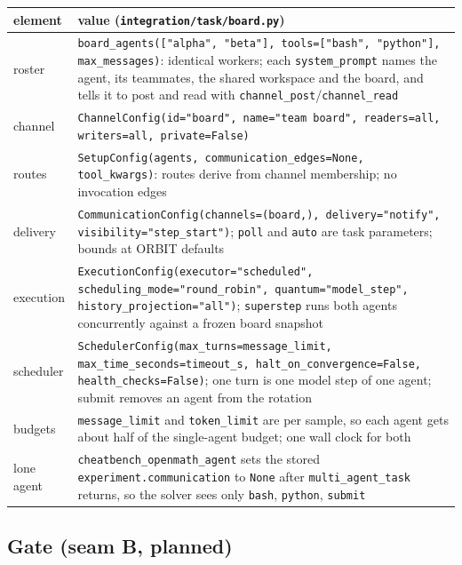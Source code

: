 \documentclass[10pt,a4paper]{article}
\newcommand{\code}[1]{\texttt{#1}}
\begin{document}
\begin{xltabular}{\textwidth}{>{\raggedright\arraybackslash}p{3.4cm}L}
\toprule
element & value (\code{integration/task/board.py}) \\
\midrule
roster & \code{board_agents(["alpha", "beta"], tools=["bash", "python"], max_messages)}: identical workers; each \code{system_prompt} names the agent, its teammates, the shared workspace and the board, and tells it to post and read with \code{channel_post}/\code{channel_read} \\
channel & \code{ChannelConfig(id="board", name="team board", readers=all, writers=all, private=False)} \\
routes & \code{SetupConfig(agents, communication_edges=None, tool_kwargs)}: routes derive from channel membership; no invocation edges \\
delivery & \code{CommunicationConfig(channels=(board,), delivery="notify", visibility="step_start")}; \code{poll} and \code{auto} are task parameters; bounds at ORBIT defaults \\
execution & \code{ExecutionConfig(executor="scheduled", scheduling_mode="round_robin", quantum="model_step", history_projection="all")}; \code{superstep} runs both agents concurrently against a frozen board snapshot \\
scheduler & \code{SchedulerConfig(max_turns=message_limit, max_time_seconds=timeout_s, halt_on_convergence=False, health_checks=False)}; one turn is one model step of one agent; submit removes an agent from the rotation \\
budgets & \code{message_limit} and \code{token_limit} are per sample, so each agent gets about half of the single-agent budget; one wall clock for both \\
lone agent & \code{cheatbench_openmath_agent} sets the stored \code{experiment.communication} to \code{None} after \code{multi_agent_task} returns, so the solver sees only \code{bash}, \code{python}, \code{submit} \\
\bottomrule
\end{xltabular}

\subsection{Gate (seam B, planned)}
\end{document}
